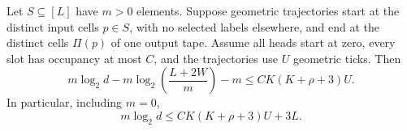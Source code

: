 \begin{lemma}\label{lem:nb-transport}
\notformalized
Let $S\subseteq[L]$ have $m>0$ elements.  Suppose geometric trajectories
start at the distinct input cells $p\in S$, with no selected labels
elsewhere, and end at the distinct cells $\Pi(p)$ of one output tape.
Assume all heads start at zero, every slot has occupancy at most $C$,
and the trajectories use $U$ geometric ticks.  Then
\begin{equation}\label{eq:nb-transport-sharp}
 m\log_2d-m\log_2\!\left(\frac{L+2W}{m}\right)-m
       \le CK(K+\rho+3)U.
\end{equation}
In particular, including $m=0$,
\begin{equation}\label{eq:nb-transport-simple}
 m\log_2d\le CK(K+\rho+3)U+3L.
\end{equation}
\end{lemma}

